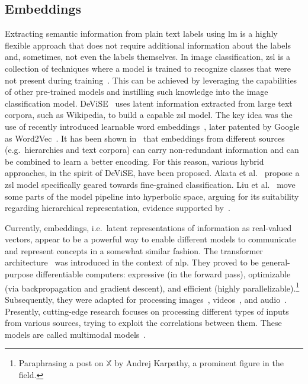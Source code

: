 \subsection{Embeddings}
\label{subsec:embeddings}

Extracting semantic information from plain text labels using \acrshort{lm} is a highly flexible approach that does not require additional information about the labels and, sometimes, not even the labels themselves. In image classification, \acrfull{zsl} is a collection of techniques where a model is trained to recognize classes that were not present during training~\cite{AnIntroductionSoysal2020}. This can be achieved by leveraging the capabilities of other pre-trained models and instilling such knowledge into the image classification model.
DeViSE~\cite{DeviseADeepFrome2013} uses latent information extracted from large text corpora, such as Wikipedia, to build a capable \acrshort{zsl} model. The key idea was the use of recently introduced learnable word embeddings~\cite{EfficientEstimMikolo2013, DistributedRepMikolo2013}, later patented by Google as
Word2Vec~\cite{ComputingNumerMikolo2013}. 
It has been shown in~\cite{EvaluationOfOAkata2014, LabelEmbeddingAkata2015} that embeddings from different sources (e.g.\ hierarchies and text corpora) can carry non-redundant information and can be combined to learn a better encoding. For this reason, various hybrid approaches, in the spirit of DeViSE, have been proposed. 
Akata et al.~\cite{EvaluationOfOAkata2014} propose a \acrshort{zsl} model specifically geared towards fine-grained classification.
Liu et al.~\cite{HyperbolicVisuLiuS2020} move some parts of the model pipeline into hyperbolic space, arguing for its suitability regarding hierarchical representation, evidence supported by~\cite{PoincareEmbeddNickel2017, HyperbolicEntaGanea2018}.

Currently, embeddings, i.e.\ latent representations of information as real-valued vectors, appear to be a powerful way to enable different models to communicate and represent concepts in a somewhat similar fashion. The transformer architecture~\cite{AttentionIsAlVaswan2017} was introduced in the context of \acrfull{nlp}. They proved to be general-purpose differentiable computers: expressive (in the forward pass), optimizable (via backpropagation and gradient descent), and efficient (highly parallelizable).\footnote{Paraphrasing a post on $\mathbb{X}$ by Andrej Karpathy, a prominent figure in the field.} Subsequently, they were adapted for processing images~\cite{ImageTransformParmar2018, EndToEndObjeCarion2020, AnImageIsWorDosovi2020}, videos~\cite{VivitAVideoArnab2021, TemporalContexShao2020}, and audio~\cite{NeuralSpeechSLiNa2018, SpeechTransforDong2018, ConformerConvGulati2020}. 
Presently, cutting-edge research focuses on processing different types of inputs from various sources, trying to exploit the correlations between them. These models are called multimodal models~\cite{ASurveyOnMulYinS2023}.

